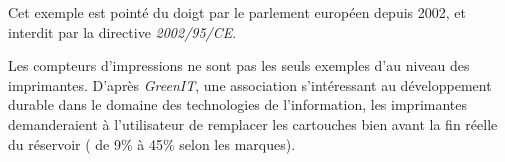 Cet exemple est pointé du doigt par le parlement européen depuis 2002, et interdit par la directive \textit{2002/95/CE}. 
\smallbreak

Les compteurs d'impressions ne sont pas les seuls exemples d'\op au niveau des imprimantes. D'après \textit{GreenIT}\cite{greenit_cartouche_encre}, une association s'intéressant au développement durable  dans le domaine des  technologies de l'information, les imprimantes demanderaient à l'utilisateur de remplacer les cartouches bien avant la fin réelle du réservoir ( de 9\% à 45\% selon les marques).


\medbreak

